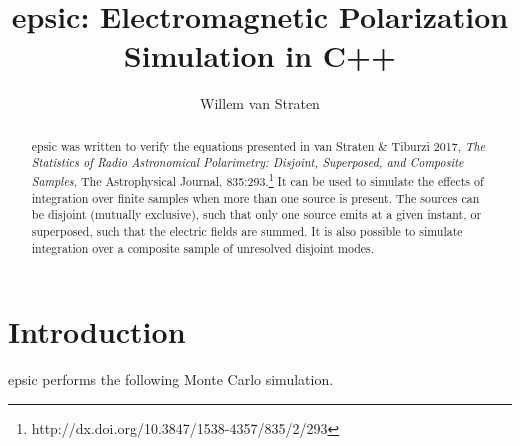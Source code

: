 \documentclass[12pt]{article}
\begin{document}
\title{ {\sc epsic}: Electromagnetic Polarization Simulation in C++ }

\author{Willem van Straten}

\maketitle

\begin{abstract}

{\sc epsic} was written to verify the equations presented in
van Straten \& Tiburzi 2017, {\it The Statistics of Radio Astronomical Polarimetry: Disjoint, Superposed, and Composite Samples}, The Astrophysical Journal, 835:293.\footnote{http://dx.doi.org/10.3847/1538-4357/835/2/293}
It can be used to simulate the effects of integration over finite samples when more than one source is present. The sources can be disjoint (mutually exclusive), such that only one source emits at a given instant, or superposed, such that the electric fields are summed. It is also possible to simulate integration over a composite sample of unresolved disjoint modes.

\end{abstract}



\section {Introduction}

{\sc epsic} performs the following Monte Carlo simulation.
\end{document}
